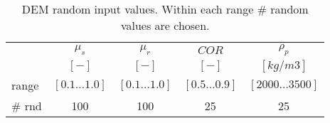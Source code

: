 \begin{table}[h]
\centering
\begin{tabular}{lcccc}
\hline
 &  $\mu_s$ & $\mu_r$ & $COR$ & $\rho_p$  \\
  &	$[-]$  & $[-]$   & $[-]$   & $[kg/m3]$ \\
          \hline
    range & $[0.1 \ldots 1.0]$ & $[0.1 \ldots 1.0]$ & $[0.5 \ldots 0.9]$ &
    $[2000 \ldots 3500]$     \\
    \# rnd & 100   & 100   & 25    & 25    \\

\hline
\end{tabular}
\caption[DEM random input values]{DEM random input values. Within each range \#
random values are chosen.}
\label{tab:12DEMRandominputvalues}
\end{table}